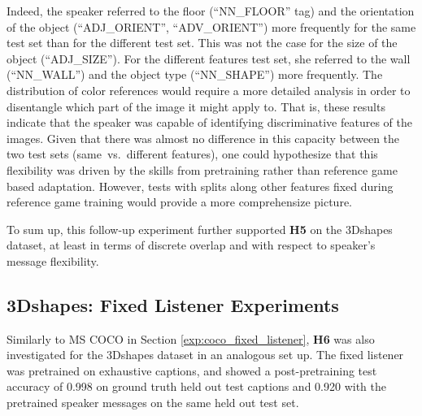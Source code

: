 Indeed, the speaker referred to the floor (``NN\_FLOOR'' tag) and the orientation of the object (``ADJ\_ORIENT'', ``ADV\_ORIENT'') more frequently for the same test set than for the different test set. This was not the case for the size of the object (``ADJ\_SIZE''). For the different features test set, she referred to the wall (``NN\_WALL'') and the object type (``NN\_SHAPE'') more frequently. 
The distribution of color references would require a more detailed analysis in order to disentangle which part of the image it might apply to. That is, these results indicate that the speaker was capable of identifying discriminative features of the images. Given that there was almost no difference in this capacity between the two test sets (same~vs.~different features), one could hypothesize that this flexibility was driven by the skills from pretraining rather than reference game based adaptation. However, tests with splits along other features fixed during reference game training would provide a more comprehensize picture.

To sum up, this follow-up experiment further supported \textbf{H5} on the 3Dshapes dataset, at least in terms of discrete overlap and with respect to speaker's message flexibility.


\subsection{3Dshapes: Fixed Listener Experiments}
\label{expt:3dshapes_fixed}

Similarly to MS COCO in Section \ref{exp:coco_fixed_listener}, \textbf{H6} was also investigated for the 3Dshapes dataset in an analogous set up. The fixed listener was pretrained on exhaustive captions, and showed a post-pretraining test accuracy of 0.998 on ground truth held out test captions and 0.920 with the pretrained speaker messages on the same held out test set. 


